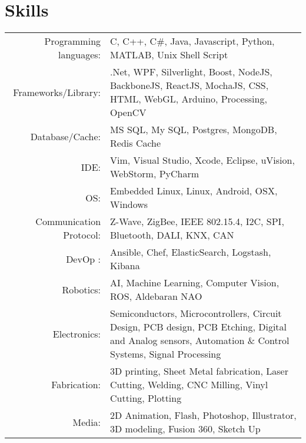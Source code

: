 \section{Skills}

\begin{tabular}
		{r p{10cm}} 
		Programming languages:& C, C++, C\#, Java, Javascript, Python, MATLAB, Unix Shell Script\\
		Frameworks/Library:& .Net, WPF, Silverlight, Boost, NodeJS, BackboneJS, ReactJS, MochaJS, CSS, HTML, WebGL, Arduino, Processing, OpenCV\\
		Database/Cache:& MS SQL, My SQL, Postgres, MongoDB, Redis Cache\\
		IDE:& Vim, Visual Studio, Xcode, Eclipse, uVision, WebStorm, PyCharm\\
		OS:&  Embedded Linux, Linux, Android, OSX, Windows\\
		Communication Protocol:& Z-Wave, ZigBee, IEEE 802.15.4, I2C, SPI, Bluetooth, DALI, KNX, CAN\\
		DevOp :& Ansible, Chef, ElasticSearch, Logstash, Kibana\\
		Robotics:& AI, Machine Learning, Computer Vision, ROS, Aldebaran NAO\\
		Electronics:&Semiconductors, Microcontrollers, Circuit Design, PCB design, PCB Etching, Digital and Analog sensors, Automation \& Control Systems, Signal Processing\\
		Fabrication:&3D printing, Sheet Metal fabrication, Laser Cutting, Welding, CNC Milling, Vinyl Cutting, Plotting\\
		Media:& 2D Animation, Flash, Photoshop, Illustrator, 3D modeling, Fusion 360, Sketch Up
\end{tabular}